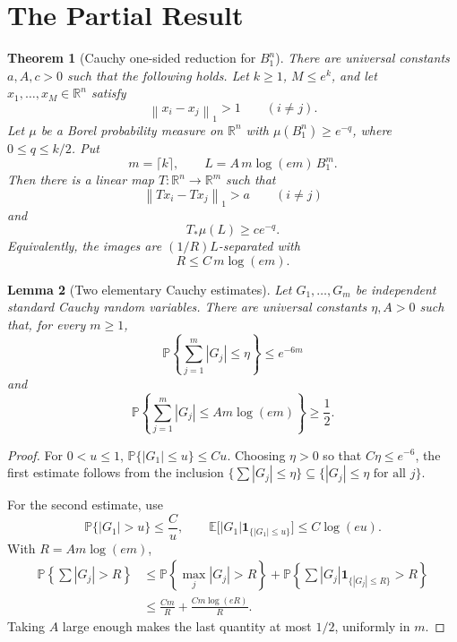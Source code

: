 \documentclass[11pt]{article}
\newtheorem{theorem}{Theorem}
\newtheorem{lemma}[theorem]{Lemma}
\newcommand{\R}{\mathbb R}
\newcommand{\Pbb}{\mathbb P}
\newcommand{\E}{\mathbb E}
\newcommand{\norm}[1]{\left\lVert #1 \right\rVert}
\begin{document}
\section*{The Partial Result}

\begin{theorem}[Cauchy one-sided reduction for \(B_1^n\)]
\label{thm:cauchy-b1}
There are universal constants \(a,A,c>0\) such that the following holds.  Let
\(k\ge 1\), \(M\le e^k\), and let \(x_1,\ldots,x_M\in\R^n\) satisfy
\[
  \norm{x_i-x_j}_1>1 \qquad (i\ne j).
\]
Let \(\mu\) be a Borel probability measure on \(\R^n\) with
\(\mu(B_1^n)\ge e^{-q}\), where \(0\le q\le k/2\).  Put
\[
  m=\lceil k\rceil, \qquad L=A\,m\log(e m)\,B_1^m .
\]
Then there is a linear map \(T:\R^n\to\R^m\) such that
\[
  \norm{Tx_i-Tx_j}_1>a \qquad (i\ne j)
\]
and
\[
  T_*\mu(L)\ge c e^{-q}.
\]
Equivalently, the images are \((1/R)L\)-separated with
\[
  R\le C\,m\log(e m).
\]
\end{theorem}

\begin{lemma}[Two elementary Cauchy estimates]
\label{lem:cauchy}
Let \(G_1,\ldots,G_m\) be independent standard Cauchy random variables.  There
are universal constants \(\eta,A>0\) such that, for every \(m\ge 1\),
\[
  \Pbb\left\{\sum_{j=1}^m |G_j|\le \eta\right\}\le e^{-6m}
\]
and
\[
  \Pbb\left\{\sum_{j=1}^m |G_j|\le A m\log(e m)\right\}\ge \frac12 .
\]
\end{lemma}

\begin{proof}
For \(0<u\le 1\), \(\Pbb\{|G_1|\le u\}\le C u\).  Choosing \(\eta>0\) so that
\(C\eta\le e^{-6}\), the first estimate follows from the inclusion
\(\{\sum |G_j|\le\eta\}\subseteq\{|G_j|\le\eta \text{ for all }j\}\).

For the second estimate, use
\[
  \Pbb\{|G_1|>u\}\le \frac{C}{u},
  \qquad
  \E\bigl[|G_1|\mathbf 1_{\{|G_1|\le u\}}\bigr]\le C\log(eu).
\]
With \(R=A m\log(e m)\),
\[
\begin{aligned}
\Pbb\left\{\sum |G_j|>R\right\}
&\le \Pbb\left\{\max_j |G_j|>R\right\}
   +\Pbb\left\{\sum |G_j|\mathbf 1_{\{|G_j|\le R\}}>R\right\}  \\
&\le \frac{C m}{R}+\frac{C m\log(eR)}{R}.
\end{aligned}
\]
Taking \(A\) large enough makes the last quantity at most \(1/2\), uniformly
in \(m\).
\end{proof}
\end{document}

